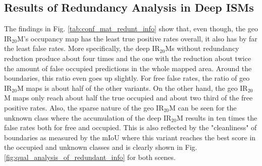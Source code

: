 \subsection{Results of Redundancy Analysis in Deep ISMs}
\label{subsec:results_of_red_analy}
The findings in Fig. \ref{tab:conf_mat_redunt_info} show that, even though, the geo IR$_{20}$M's occupancy map has the least true positive rates overall, it also has by far the least false rates. More specifically, the deep IR$_{20}$Ms without redundancy reduction produce about four times and the one with the reduction about twice the amount of false occupied predictions in the whole mapped area. Around the boundaries, this ratio even goes up slightly. For free false rates, the ratio of geo IR$_{20}$M maps is about half of the other variants. On the other hand, the geo IR$_{20}$M maps only reach about half the true occupied and about two third of the free positive rates. Also, the sparse nature of the geo IR$_{20}$M can be seen for the unknown class where the accumulation of the deep IR$_{20}$M results in ten times the false rates both for free and occupied. This is also reflected by the "cleanliness" of boundaries as measured by the mIoU where this variant reaches the best score in the occupied and unknown classes and is clearly shown in Fig. \ref{fig:qual_analysis_of_redundant_info} for both scenes.
